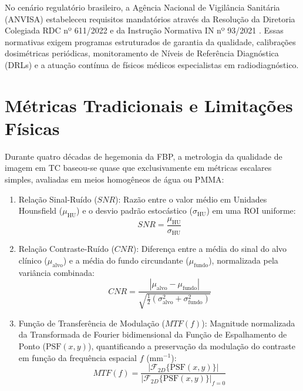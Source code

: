 \documentclass[
  12pt,
  a4paper,
  oneside
]{report}
\begin{document}
No cenário regulatório brasileiro, a Agência Nacional de Vigilância Sanitária (ANVISA) estabeleceu requisitos mandatórios através da Resolução da Diretoria Colegiada RDC nº 611/2022 e da Instrução Normativa IN nº 93/2021 \cite{anvisa_rdc611_2022, anvisa_in93_2021}. Essas normativas exigem programas estruturados de garantia da qualidade, calibrações dosimétricas periódicas, monitoramento de Níveis de Referência Diagnóstica (DRLs) e a atuação contínua de físicos médicos especialistas em radiodiagnóstico.

\section{Métricas Tradicionais e Limitações Físicas}
\label{sec:metricas_escalares_tradicionais}

Durante quatro décadas de hegemonia da FBP, a metrologia da qualidade de imagem em TC baseou-se quase que exclusivamente em métricas escalares simples, avaliadas em meios homogêneos de água ou PMMA:
\begin{enumerate}
  \item Relação Sinal-Ruído ($SNR$): Razão entre o valor médio em Unidades Hounsfield ($\mu_{\text{HU}}$) e o desvio padrão estocástico ($\sigma_{\text{HU}}$) em uma ROI uniforme:
  \begin{equation}
    SNR = \frac{\mu_{\text{HU}}}{\sigma_{\text{HU}}}
    \label{eq:snr_formula}
  \end{equation}
  \item Relação Contraste-Ruído ($CNR$): Diferença entre a média do sinal do alvo clínico ($\mu_{\text{alvo}}$) e a média do fundo circundante ($\mu_{\text{fundo}}$), normalizada pela variância combinada:
  \begin{equation}
    CNR = \frac{|\mu_{\text{alvo}} - \mu_{\text{fundo}}|}{\sqrt{\frac{1}{2}(\sigma_{\text{alvo}}^2 + \sigma_{\text{fundo}}^2)}}
    \label{eq:cnr_formula}
  \end{equation}
  \item Função de Transferência de Modulação ($MTF(f)$): Magnitude normalizada da Transformada de Fourier bidimensional da Função de Espalhamento de Ponto ($\text{PSF}(x, y)$), quantificando a preservação da modulação do contraste em função da frequência espacial $f$ ($\text{mm}^{-1}$):
  \begin{equation}
    MTF(f) = \frac{|\mathcal{F}_{2D}\{\text{PSF}(x, y)\}|}{|\mathcal{F}_{2D}\{\text{PSF}(x, y)\}|_{f=0}}
    \label{eq:mtf_formula}
  \end{equation}
\end{enumerate}
\end{document}
